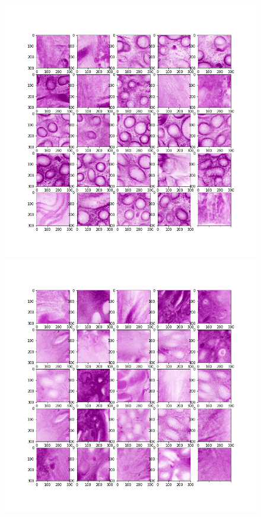 \begin{figure}[H]
	\centering
	
	\begin{minipage}{0.45\columnwidth}
		\centering
		\includegraphics[clip, width=\linewidth]{fig/preprocessing/cropping/HE/normal/C-013}
	\end{minipage}
	\begin{minipage}{0.45\columnwidth}
		\centering
		\includegraphics[clip, width=\linewidth]{fig/preprocessing/cropping/HE/cancer/C-013}
	\end{minipage}
	

\end{figure}
